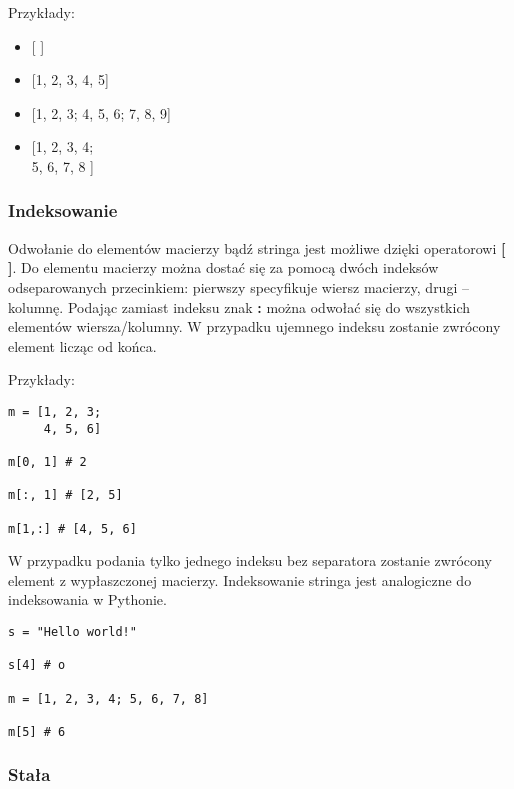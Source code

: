 \documentclass[12pt,a4paper]{article}
\begin{document}
\bigskip
Przykłady:

\begin{itemize}

\item {[ ]}

\item {[1, 2, 3, 4, 5]}

\item {[1, 2, 3; 4, 5, 6; 7, 8, 9]}

\item {[1, 2, 3, 4;\\
        5, 6, 7, 8  ]}

\end{itemize}

\subsubsection{Indeksowanie}

Odwołanie do elementów macierzy bądź stringa jest możliwe dzięki operatorowi \textbf{[ ]}. Do elementu macierzy można dostać się za pomocą dwóch indeksów odseparowanych przecinkiem: pierwszy specyfikuje wiersz macierzy, drugi -- kolumnę. Podając zamiast indeksu znak \textbf{:} można odwołać się do wszystkich elementów wiersza/kolumny. W przypadku ujemnego indeksu zostanie zwrócony element licząc od końca.

\medskip
Przykłady:

\begin{lstlisting}
m = [1, 2, 3;
     4, 5, 6]
     
m[0, 1] # 2

m[:, 1] # [2, 5]

m[1,:] # [4, 5, 6]
\end{lstlisting}

W przypadku podania tylko jednego indeksu bez separatora zostanie zwrócony element z wypłaszczonej macierzy. Indeksowanie stringa jest analogiczne do indeksowania w Pythonie.

\begin{lstlisting}
s = "Hello world!"

s[4] # o

m = [1, 2, 3, 4; 5, 6, 7, 8]

m[5] # 6
\end{lstlisting}

\subsubsection{Stała}
\end{document}
